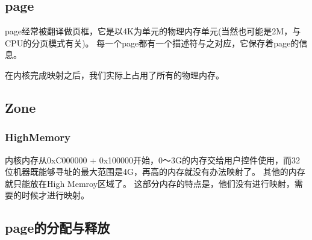 \subsection{page}
page经常被翻译做页框，它是以4K为单元的物理内存单元(当然也可能是2M，与CPU的分页模式有关)。
每一个page都有一个描述符与之对应，它保存着page的信息。


在内核完成映射之后，我们实际上占用了所有的物理内存。
\subsection{Zone}

\subsubsection{HighMemory}
内核内存从0xC000000 + 0x100000开始，0～3G的内存交给用户控件使用，而32位机器既能够寻址的最大范围是4G，再高的内存就没有办法映射了。
其他的内存就只能放在High Memroy区域了。
这部分内存的特点是，他们没有进行映射，需要的时候才进行映射。

\subsection{page的分配与释放}

